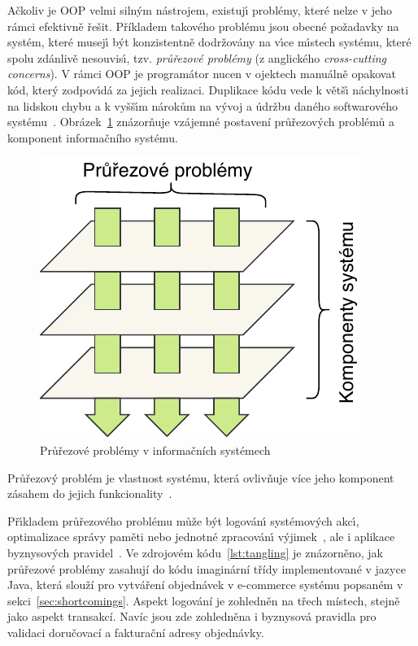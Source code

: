 Ačkoliv je \gls{OOP} velmi siln\'ym nástrojem, existuj\'{\i} problémy,
které nelze v jeho rámci efektivně řešit.
Příkladem takového problému jsou obecné požadavky na systém,
které musej\'{\i} b\'yt konzistentně dodržovány na v\'{\i}ce
m\'{\i}stech systému, které spolu zdánlivě nesouvis\'{\i},
tzv. \textit{průřezové problémy} (z anglického \textit{cross-cutting concerns}).
V rámci \gls{OOP} je programátor nucen v ojektech manuálně opakovat
kód, kter\'y zodpov\'{\i}dá za jejich realizaci. Duplikace kódu
vede k větš\'{\i} náchylnosti na lidskou chybu a k vyšš\'{\i}m nárokům na v\'yvoj
a údržbu daného softwarového systému~\cite{fowler1999refactoring}.
Obrázek~\ref{fig:cross-cutting} znázorňuje vzájemné postavení průřezových
problémů a komponent informačního systému.

\begin{figure}[t]
    \centering
    \includegraphics[keepaspectratio=true, width=0.35\linewidth]{figures/cross-cutting.pdf}
    \caption{Průřezové problémy v informačních systémech}
    \label{fig:cross-cutting}
\end{figure}

\begin{definition}
    Průřezový problém je vlastnost systému, která ovlivňuje více jeho komponent
    zásahem do jejich funkcionality~\cite{kiczales1997aspect}.
\end{definition}

Př\'{\i}kladem průřezového problému může b\'yt logován\'{\i}
systémov\'ych akc\'{\i}, optimalizace správy paměti
nebo jednotné zpracován\'{\i} v\'yjimek~\cite{kiczales1997aspect},
ale i aplikace byznysových pravidel~\cite{cemus2014aspect}.
Ve zdrojovém kódu~\ref{lst:tangling} je znázorněno, jak průřezové
problémy zasahují do kódu imaginární třídy implementované v
jazyce Java, která slouží pro vytváření objednávek v e-commerce
systému popsaném v sekci~\ref{sec:shortcomings}.
Aspekt logování je zohledněn na třech místech, stejně jako aspekt transakcí.
Navíc jsou zde zohledněna i byznysová pravidla pro validaci doručovací
a fakturační adresy objednávky.

